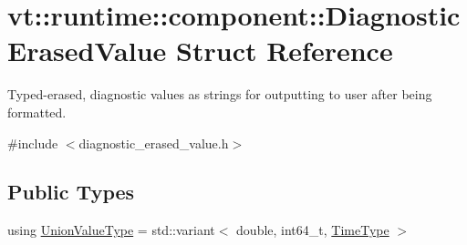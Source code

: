 \hypertarget{structvt_1_1runtime_1_1component_1_1_diagnostic_erased_value}{}\section{vt\+:\+:runtime\+:\+:component\+:\+:Diagnostic\+Erased\+Value Struct Reference}
\label{structvt_1_1runtime_1_1component_1_1_diagnostic_erased_value}


Typed-\/erased, diagnostic values as strings for outputting to user after being formatted.  




{\ttfamily \#include $<$diagnostic\+\_\+erased\+\_\+value.\+h$>$}

\subsection*{Public Types}
\begin{DoxyCompactItemize}
\item 
using \hyperlink{structvt_1_1runtime_1_1component_1_1_diagnostic_erased_value_a92484d3d64af3428f02087686271299b}{Union\+Value\+Type} = std\+::variant$<$ double, int64\+\_\+t, \hyperlink{namespacevt_a2b9f28078dc309ad0706b69ded743e69}{Time\+Type} $>$
\end{DoxyCompactItemize}
